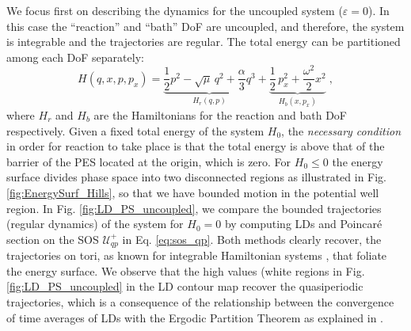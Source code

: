 \documentclass[8pt]{article}
\begin{document}
We focus first on describing the dynamics for the uncoupled system ($\varepsilon = 0$). In this case the ``reaction'' and ``bath'' DoF are uncoupled, and therefore, the system is integrable and the trajectories are regular. The total energy can be partitioned among each DoF separately:
\begin{equation}
H(q,x,p,p_x) = \underbrace{\frac{1}{2} p^2 - \sqrt{\mu} \, q^2 + \frac{\alpha}{3} q^3}_{H_r(q,p)} + \underbrace{\frac{1}{2} \, p_x^2 + \frac{\omega^2}{2} x^2}_{H_b(x,p_x)} \;,
\end{equation}
where $H_r$ and $H_b$ are the Hamiltonians for the reaction and bath DoF respectively. Given a fixed total energy of the system $H_0$, the \textit{necessary condition} in order for reaction to take place is that the total energy is above that of the barrier of the PES located at the origin, which is zero. For $H_0 \leq 0$ the energy surface divides phase space into two disconnected regions as illustrated in Fig. \ref{fig:EnergySurf_Hills}, so that we have bounded motion in the potential well region. In Fig. \ref{fig:LD_PS_uncoupled}, we compare the bounded trajectories (regular dynamics) of the system for $H_0 = 0$ by computing LDs and Poincar\'e section on the SOS $\mathcal{U}_{qp}^{+}$ in Eq. \eqref{eq:sos_qp}. Both methods clearly recover, the trajectories on tori, as known for integrable Hamiltonian systems \cite{Meyer2009}, that foliate the energy surface. We observe that the high values (white regions in Fig. \ref{fig:LD_PS_uncoupled} in the LD contour map recover the quasiperiodic trajectories, which is a consequence of the relationship between the convergence of time averages of LDs with the Ergodic Partition Theorem as explained in \cite{lopesino2017}. 
\end{document}
